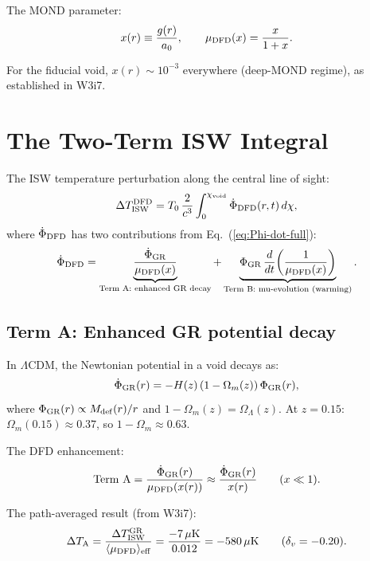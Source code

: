 \documentclass[11pt,a4paper]{article}
\newcommand{\LCDM}{$\Lambda$CDM}
\newcommand{\aM}{a_0}
\newcommand{\mufd}{\mu_{\rm DFD}}
\newcommand{\Omm}{\Omega_m}
\begin{document}
The MOND parameter:
\begin{equation}
x(r) \equiv \frac{g(r)}{\aM}, \qquad
\mufd(x) = \frac{x}{1+x}.
\label{eq:x-def}
\end{equation}

For the fiducial void, $x(r) \sim 10^{-3}$ everywhere
(deep-MOND regime), as established in W3i7.


\section{The Two-Term ISW Integral}
\label{sec:two-term}

The ISW temperature perturbation along the central line of sight:
\begin{equation}
\Delta T_{\rm ISW}^{\rm DFD}
= T_0\,\frac{2}{c^3}\int_0^{\chi_{\rm void}}
\dot{\Phi}_{\rm DFD}(r,t)\,d\chi,
\label{eq:ISW-DFD}
\end{equation}
where $\dot{\Phi}_{\rm DFD}$ has two contributions from
Eq.~(\ref{eq:Phi-dot-full}):
\begin{equation}
\dot{\Phi}_{\rm DFD}
= \underbrace{\frac{\dot{\Phi}_{\rm GR}}{\mufd(x)}}_{\text{Term A: enhanced GR decay}}
+ \underbrace{\Phi_{\rm GR}\,\frac{d}{dt}\!\left(\frac{1}{\mufd(x)}\right)}_{\text{Term B: mu-evolution (warming)}}.
\label{eq:two-terms}
\end{equation}

\subsection{Term A: Enhanced GR potential decay}

In \LCDM, the Newtonian potential in a void decays as:
\begin{equation}
\dot{\Phi}_{\rm GR}(r) = -H(z)\,(1 - \Omm(z))\,\Phi_{\rm GR}(r),
\label{eq:Phi-dot-GR}
\end{equation}
where $\Phi_{\rm GR}(r) \propto M_{\rm def}(r)/r$ and
$1 - \Omm(z) = \Omega_\Lambda(z)$.
At $z = 0.15$: $\Omm(0.15) \approx 0.37$, so
$1 - \Omm \approx 0.63$.

The DFD enhancement:
\begin{equation}
\text{Term A} = \frac{\dot{\Phi}_{\rm GR}(r)}{\mufd(x(r))}
\approx \frac{\dot{\Phi}_{\rm GR}(r)}{x(r)}
\qquad (x \ll 1).
\end{equation}

The path-averaged result (from W3i7):
\begin{equation}
\Delta T_{\rm A} = \frac{\Delta T_{\rm ISW}^{\rm GR}}{\langle\mufd\rangle_{\rm eff}}
= \frac{-7\,\mu\text{K}}{0.012} = -580\,\mu\text{K}
\qquad (\delta_v = -0.20).
\label{eq:term-A}
\end{equation}
\end{document}
